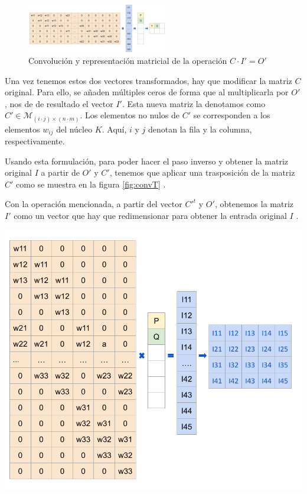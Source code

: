 \begin{figure}[h!]
    \centering
    \includegraphics[width=0.55\textwidth]{img/conv2.png}
    \caption{Convolución y representación matricial de la operación  $C \cdot I' = O'$}
    \label{fig:conv2}
\end{figure}

\begin{minipage}{0.5\textwidth}
Una vez tenemos estos dos vectores transformados, hay que modificar la matriz $C$ original. Para ello, se añaden múltiples ceros de forma que al multiplicarla por $O'$, nos de de resultado el vector $I'$. Esta nueva matriz la denotamos como $C' \in \mathcal{M}_{(i\cdot j) \times (n\cdot m)}$. Los elementos no nulos de $C'$ se corresponden a los elementos $w_{ij}$ del núcleo \(K\). Aquí, \(i\) y \(j\) denotan la fila y la columna, respectivamente. 

\bigskip

Usando esta formulación, para poder hacer el paso inverso y obtener la matriz original $I$ a partir de $O'$ y $C'$, tenemos que aplicar una trasposición de la matriz $C'$ como se muestra en la figura \ref{fig:convT}  \citep{pajares2021aprendizaje}.


\bigskip

Con la operación mencionada, a partir del vector $C'^t$ y $O'$, obtenemos la matriz $I'$ como un vector que hay que redimensionar para obtener la entrada original $I$ \citep{pajares2021aprendizaje}.
\end{minipage}
\begin{minipage}{0.05\textwidth}
	\textbf{ }	
\end{minipage}
\begin{minipage}{0.45\textwidth}
	\includegraphics[width=1.1\textwidth]{img/convT.png}
    \label{fig:convT}
\end{minipage}


